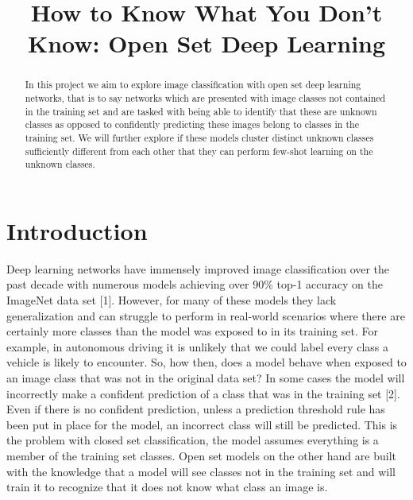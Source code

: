 \documentclass[conference]{IEEEtran}
\begin{document}
\title{How to Know What You Don't Know: Open Set Deep Learning\\}

\author{
\and
{}
\and
{}
}

\maketitle

\begin{abstract}
In this project we aim to explore image classification with open set deep learning networks, that is to say networks which are presented with image classes not contained in the training set and are tasked with being able to identify that these are unknown classes as opposed to confidently predicting these images belong to classes in the training set. We will further explore if these models cluster distinct unknown classes sufficiently different from each other that they can perform few-shot learning on the unknown classes. 
\end{abstract}

\section{Introduction}
Deep learning networks have immensely improved image classification over the past decade with numerous models achieving over 90\% top-1 accuracy on the ImageNet data set [1]. However, for many of these models they lack generalization and can struggle to perform in real-world scenarios where there are certainly more classes than the model was exposed to in its training set. For example, in autonomous driving it is unlikely that we could label every class a vehicle is likely to encounter. So, how then, does a  model behave when exposed to an image class that was not in the original data set? In some cases the model will incorrectly make a confident prediction of a class that was in the training set [2]. Even if there is no confident prediction, unless a prediction threshold rule has been put in place for the model, an incorrect class will still be predicted. This is the problem with closed set classification, the model assumes everything is a member of the training set classes. Open set models on the other hand are built with the knowledge that a model will see classes not in the training set and will train it to recognize that it does not know what class an image is.\\
\end{document}
